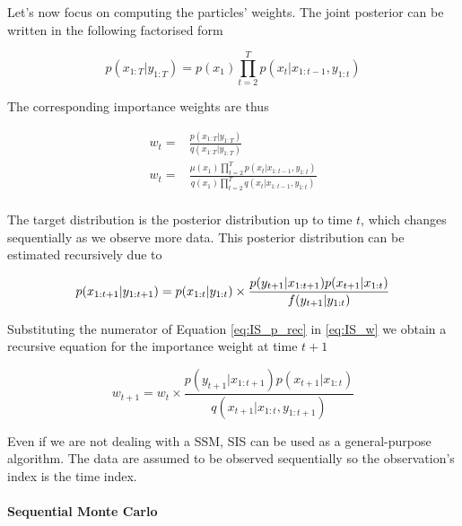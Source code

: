 Let's now focus on computing the particles' weights. The joint posterior can be written in the following factorised form

$$ p(x_{1:T}|y_{1:T}) = p(x_1) \prod_{t=2}^T p(x_t|x_{1:t-1},y_{1:t}) $$

The corresponding importance weights are thus

\begin{equation} \label{eq:IS_w}
\begin{aligned}
w_t =& \frac{p(x_{1:T}|y_{1:T})}{q(x_{1:T}|y_{1:T})} \\
w_t =& \frac{\mu(x_1) \prod_{t=2}^T p(x_t|x_{1:t-1},y_{1:t})}{q(x_1) \prod_{t=2}^T q(x_t|x_{1:t-1},y_{1:t})} \\
\end{aligned}
\end{equation}

The target distribution is the posterior distribution up to time $t$, which changes sequentially as we observe more data. This posterior distribution can be estimated recursively due to

\begin{equation} \label{eq:IS_p_rec}
p(x_{1:t+1}|y_{1:t+1}) = p(x_{1:t}|y_{1:t}) \times \frac{p(y_{t+1}|x_{1:t+1})p(x_{t+1}|x_{1:t})}{f(y_{t+1}|y_{1:t})} \\
\end{equation}

Substituting the numerator of Equation \ref{eq:IS_p_rec} in \ref{eq:IS_w} we obtain a recursive equation for the importance weight at time $t+1$

$$ w_{t+1} = w_{t} \times \frac{p(y_{t+1}|x_{1:t+1})p(x_{t+1}|x_{1:t})}{q(x_{t+1}|x_{1:t},y_{1:t+1})} $$


Even if we are not dealing with a \gls{SSM}, \gls{SIS} can be used as a general-purpose algorithm. The data are assumed to be observed sequentially so the observation’s index is the time index.


\paragraph{Sequential Monte Carlo}


